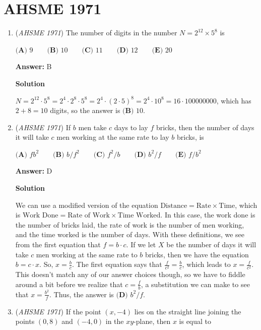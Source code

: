 \section{AHSME 1971}
        \begin{enumerate}
        	\item (\textit{AHSME 1971}) The number of digits in the number $N=2^{12}\times 5^8$ is


 $\textbf{(A) }9\qquad \textbf{(B) }10\qquad \textbf{(C) }11\qquad \textbf{(D) }12\qquad  \textbf{(E) }20$

 \textbf{Answer: }B



\textbf{Solution}

$N=2^{12}\cdot5^8=2^4\cdot2^8\cdot5^8=2^4\cdot(2\cdot5)^8=2^4\cdot10^8=16\cdot100000000$, which has $2+8=10$ digits, so the answer is $\boxed{\textbf{(B) }10}$.

 


	\item (\textit{AHSME 1971}) If $b$ men take $c$ days to lay $f$ bricks, then the number of days it will take $c$ men working at the same rate to lay $b$ bricks, is


 $\textbf{(A) }fb^2\qquad \textbf{(B) }b/f^2\qquad \textbf{(C) }f^2/b\qquad \textbf{(D) }b^2/f\qquad  \textbf{(E) }f/b^2$

 \textbf{Answer: }D



\textbf{Solution}

We can use a modified version of the equation $\text{Distance} = \text{Rate} \times {\text{Time}}$, which is $\text{Work Done} = \text{Rate of Work} \times{ \text{Time Worked}}$. In this case, the work done is the number of bricks laid, the rate of work is the number of men working, and the time worked is the number of days. With these definitions, we see from the first equation that $f = b \cdot c$. If we let $X$ be the number of days it will take $c$ men working at the same rate to $b$ bricks, then we have the equation $b = c \cdot x$. So, $x = \frac{b}{c}$. The first equation says that $\frac{f}{c^2} = \frac{b}{c}$, which leads to $x = \frac{f}{c^2}$. This doesn't match any of our answer choices though, so we have to fiddle around a bit before we realize that $c = \frac{f}{b}$, a substitution we can make to see that $x = \frac{b^2}{f}$. Thus, the answer is $\boxed{\textbf{(D) }b^2/f}$.

 


	\item (\textit{AHSME 1971}) If the point $(x,-4)$ lies on the straight line joining the points $(0,8)$ and $(-4,0)$ in the $xy$-plane, then $x$ is equal to



\end{enumerate}
